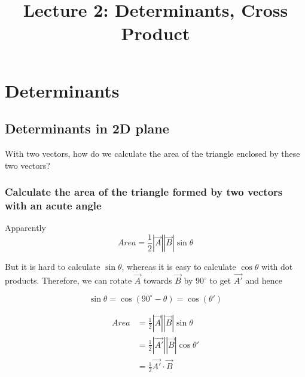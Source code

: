 \documentclass{article}
\title{Lecture 2: Determinants, Cross Product}
\author{}
\date{}
\begin{document}
    
\maketitle

\section{Determinants}

\subsection{Determinants in 2D plane}

With two vectors, how do we calculate the area of the triangle enclosed by
these two vectors?

\subsubsection{Calculate the area of the triangle formed by two vectors with an acute angle}


Apparently
\[
  Area = \frac{1}{2}|\vec{A}||\vec{B}|\sin\theta
\]

But it is hard to calculate $\sin\theta$, whereas it is easy to calculate
$\cos\theta$ with dot products. Therefore, we can rotate $\vec{A}$ towards
$\vec{B}$ by $90^{\circ}$ to get $\vec{A'}$ and hence

\[
  \sin\theta = \cos(90^{\circ} - \theta) = \cos(\theta')
\]

\[
  \begin{split}
  Area  &= \frac{1}{2} |\vec{A}| |\vec{B}| \sin\theta \\
        &= \frac{1}{2} |\vec{A'}| |\vec{B}| \cos\theta' \\
        &= \frac{1}{2} \vec{A'} \cdot \vec{B}
  \end{split}
\]
\end{document}
